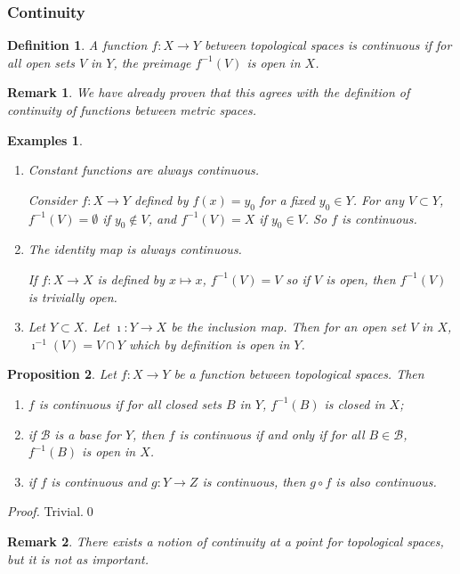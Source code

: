 \documentclass{article}
\theoremstyle{plain}\theoremheaderfont{\normalfont\itshape}\theorembodyfont{\rmfamily}\theoremseparator{.}\newtheorem*{rem}{Remark}\newtheorem*{ex}{Example}\newtheorem*{proof}{Proof}\newtheorem*{altp}{Alternative proof}
\theoremstyle{plain}\theoremheaderfont{\normalfont\bfseries}\theorembodyfont{\rmfamily}\theoremseparator{.}\newtheorem{thm}{Theorem}[section]\newtheorem{lem}[thm]{Lemma}\newtheorem{prop}[thm]{Proposition}\newtheorem*{cor}{Corollary}\newtheorem{defn}[thm]{Definition}\newtheorem{clm}[thm]{Claim}\newtheorem{clminproof}{Claim}
\theoremstyle{break}\theoremheaderfont{\normalfont\itshape}\theorembodyfont{\rmfamily}\theoremseparator{.\medskip}\newtheorem*{proofskip}{Proof}\newtheorem*{exs}{Examples}\newtheorem*{rems}{Remarks}
\theoremstyle{break}\theoremheaderfont{\normalfont\bfseries}\theorembodyfont{\rmfamily}\theoremseparator{.\medskip}\newtheorem{lemskip}[thm]{Lemma}\newtheorem{defnskip}[thm]{Definition}\newtheorem{propskip}[thm]{Proposition}\newtheorem{thmskip}[thm]{Theorem}
\newcommand{\qed}{\hfill\ensuremath{\Box}}
\DeclareMathOperator{\inc}{\imath}
\begin{document}
    \subsubsection{Continuity}
    \begin{defn}
        A function \(f:X\to Y\) between topological spaces is \textit{continuous} if for all open sets \(V\) in \(Y\), the preimage \(f^{-1}(V)\) is open in \(X\).
    \end{defn}
    \begin{rem}
        We have already proven that this agrees with the definition of continuity of functions between metric spaces.
    \end{rem}
    
    \begin{exs}
        \begin{enumerate}[label=(\roman*),topsep=0pt]
            \item Constant functions are always continuous.
            
            Consider \(f:X\to Y\) defined by \(f(x)=y_0\) for a fixed \(y_0\in Y\). For any \(V\subset Y\), \(f^{-1}(V)=\emptyset\) if \(y_0\not\in V\), and \(f^{-1}(V)=X\) if \(y_0\in V\). So \(f\) is continuous.
            \item The identity map is always continuous.
            
            If \(f:X\to X\) is defined by \(x\mapsto x\), \(f^{-1}(V)=V\) so if \(V\) is open, then \(f^{-1}(V)\) is trivially open.
            \item Let \(Y\subset X\). Let \(\inc:Y\to X\) be the inclusion map. Then for an open set \(V\) in \(X\), \(\inc^{-1}(V)=V\cap Y\) which by definition is open in \(Y\).
        \end{enumerate}
    \end{exs}

    \begin{prop}
        Let \(f:X\to Y\) be a function between topological spaces. Then
        \begin{enumerate}[label=(\roman*),topsep=0pt]
            \item \(f\) is continuous if for all closed sets \(B\) in \(Y\), \(f^{-1}(B)\) is closed in \(X\);
            \item if \(\mathscr{B}\) is a base for \(Y\), then \(f\) is continuous if and only if for all \(B\in\mathscr{B}\), \(f^{-1}(B)\) is open in \(X\).
            \item if \(f\) is continuous and \(g:Y\to Z\) is continuous, then \(g\circ f\) is also continuous.
        \end{enumerate}
    \end{prop}
    \begin{proof}
        Trivial.\qed
    \end{proof}
    \begin{rem}
        There exists a notion of \textit{continuity at a point} for topological spaces, but it is not as important.
    \end{rem}
\end{document}
